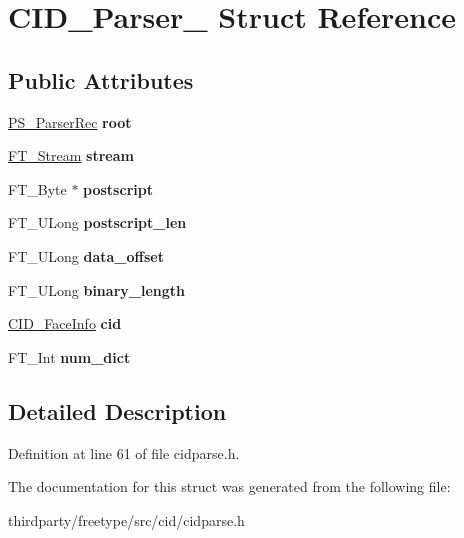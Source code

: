 \hypertarget{struct_c_i_d___parser__}{}\section{C\+I\+D\+\_\+\+Parser\+\_\+ Struct Reference}
\label{struct_c_i_d___parser__}
\subsection*{Public Attributes}
\begin{DoxyCompactItemize}
\item 
\mbox{\label{struct_c_i_d___parser___a0c9738e99dc311693c92b64c238fc88f}} 
\hyperlink{struct_p_s___parser_rec__}{P\+S\+\_\+\+Parser\+Rec} {\bfseries root}
\item 
\mbox{\label{struct_c_i_d___parser___a4012b4fa2613959368e49e2aea7f5f15}} 
\hyperlink{struct_f_t___stream_rec__}{F\+T\+\_\+\+Stream} {\bfseries stream}
\item 
\mbox{\label{struct_c_i_d___parser___a16eecdbccfcd10ae152f67a29a95862f}} 
F\+T\+\_\+\+Byte $\ast$ {\bfseries postscript}
\item 
\mbox{\label{struct_c_i_d___parser___a735f47b0f4cca133f8f472ffd64308e3}} 
F\+T\+\_\+\+U\+Long {\bfseries postscript\+\_\+len}
\item 
\mbox{\label{struct_c_i_d___parser___a496dcfa877b287a79387f0b1752af680}} 
F\+T\+\_\+\+U\+Long {\bfseries data\+\_\+offset}
\item 
\mbox{\label{struct_c_i_d___parser___aaf16effa1729504fe390407838c1ac0d}} 
F\+T\+\_\+\+U\+Long {\bfseries binary\+\_\+length}
\item 
\mbox{\label{struct_c_i_d___parser___a6f50436242a6b2fd48d278887665cd83}} 
\hyperlink{struct_c_i_d___face_info_rec__}{C\+I\+D\+\_\+\+Face\+Info} {\bfseries cid}
\item 
\mbox{\label{struct_c_i_d___parser___a20f8a481494f8b5ddf0d745230faaa87}} 
F\+T\+\_\+\+Int {\bfseries num\+\_\+dict}
\end{DoxyCompactItemize}


\subsection{Detailed Description}


Definition at line 61 of file cidparse.\+h.



The documentation for this struct was generated from the following file\+:\begin{DoxyCompactItemize}
\item 
thirdparty/freetype/src/cid/cidparse.\+h\end{DoxyCompactItemize}
